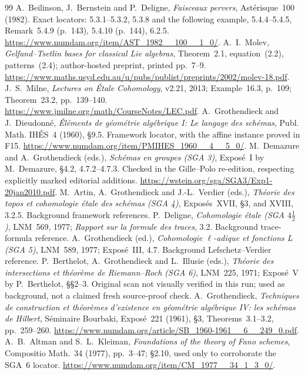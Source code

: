 \documentclass[11pt,a4paper]{article}
\theoremstyle{named}\newtheorem{finding}{Finding}[section]
\theoremstyle{definition}\newtheorem{definition}[finding]{Definition}
\theoremstyle{remark}\newtheorem{remark}[finding]{Remark}
\begin{document}
\begin{thebibliography}{99}
 A.~Beilinson, J.~Bernstein and P.~Deligne, \emph{Faisceaux pervers}, Ast\'erisque~100 (1982). Exact locators: 5.3.1--5.3.2, 5.3.8 and the following example, 5.4.4--5.4.5, Remark~5.4.9 (p.~143), 5.4.10 (p.~144), 6.2.5. \url{https://www.numdam.org/item/AST_1982__100__1_0/}.
 A.~I.~Molev, \emph{Gelfand--Tsetlin bases for classical Lie algebras}, Theorem~2.1, equation~(2.2), patterns~(2.4); author-hosted preprint, printed pp.~7--9. \url{https://www.maths.usyd.edu.au/u/pubs/publist/preprints/2002/molev-18.pdf}.
 J.~S.~Milne, \emph{Lectures on \'Etale Cohomology}, v2.21, 2013; Example~16.3, p.~109; Theorem~23.2, pp.~139--140. \url{https://www.jmilne.org/math/CourseNotes/LEC.pdf}.
 A.~Grothendieck and J.~Dieudonn\'e, \emph{\'El\'ements de g\'eom\'etrie alg\'ebrique I: Le langage des sch\'emas}, Publ. Math. IH\'ES~4 (1960), \S9.5. Framework locator, with the affine instance proved in F15. \url{https://www.numdam.org/item/PMIHES_1960__4__5_0/}.
 M.~Demazure and A.~Grothendieck (eds.), \emph{Sch\'emas en groupes (SGA 3)}, Expos\'e~I by M.~Demazure, \S4.2, 4.7.2--4.7.3. Checked in the Gille--Polo re-edition, respecting explicitly marked editorial additions. \url{https://wstein.org/sga/SGA3/Exp1-20jan2010.pdf}.
 M.~Artin, A.~Grothendieck and J.-L.~Verdier (eds.), \emph{Th\'eorie des topos et cohomologie \'etale des sch\'emas (SGA 4)}, Expos\'es~XVII, \S3, and XVIII, 3.2.5. Background framework references.
 P.~Deligne, \emph{Cohomologie \'etale (SGA $4\frac12$)}, LNM~569, 1977; \emph{Rapport sur la formule des traces}, 3.2. Background trace-formula reference.
 A.~Grothendieck (ed.), \emph{Cohomologie \(\ell\)-adique et fonctions L (SGA 5)}, LNM~589, 1977; Expos\'e~III, 4.7. Background Lefschetz--Verdier reference.
 P.~Berthelot, A.~Grothendieck and L.~Illusie (eds.), \emph{Th\'eorie des intersections et th\'eor\`eme de Riemann--Roch (SGA 6)}, LNM~225, 1971; Expos\'e~V by P.~Berthelot, \S\S2--3. Original scan not visually verified in this run; used as background, not a claimed fresh source-proof check.
 A.~Grothendieck, \emph{Techniques de construction et th\'eor\`emes d'existence en g\'eom\'etrie alg\'ebrique IV: les sch\'emas de Hilbert}, S\'eminaire Bourbaki, Expos\'e~221 (1961), \S3, Theorems~3.1--3.2, pp.~259--260. \url{https://www.numdam.org/article/SB_1960-1961__6__249_0.pdf}.
 A.~B.~Altman and S.~L.~Kleiman, \emph{Foundations of the theory of Fano schemes}, Compositio Math.~34 (1977), pp.~3--47; \S2.10, used only to corroborate the SGA~6 locator. \url{https://www.numdam.org/item/CM_1977__34_1_3_0/}.

\end{thebibliography}
\end{document}

